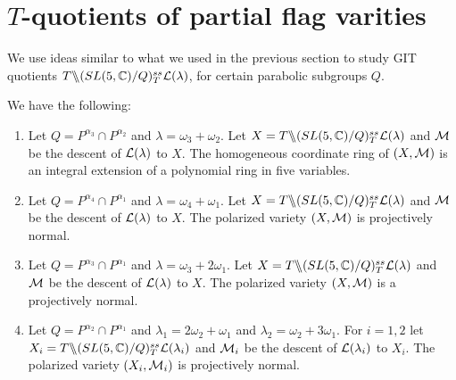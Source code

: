 \section{$T$-quotients of partial flag varities}
\label{sec:fv_normality}
We use ideas similar to what we used in the previous section to study GIT quotients $T\backslash\mkern-6mu\backslash(SL(5, \mathbb{C})/Q)^{ss}_{T} {\mathcal L}(\lambda)$, for certain parabolic subgroups $Q$. 

\begin{theorem}
\label{thm:flag}
    We have the following:
\begin{enumerate}
    \item Let $Q = P^{\alpha_3} \cap P^{\alpha_2}$ and $\lambda = \omega_3 + \omega_2$. Let $X = T \backslash\mkern-6mu\backslash (SL(5,\mathbb{C})/Q)^{ss}_T {\cal L}(\lambda)$ and \(\cal M\) be the descent of \(\cal L(\lambda)\) to \(X\).  The homogeneous coordinate ring of $(X,{\cal M})$ is an integral extension of a polynomial ring in five variables.
    \item Let $Q = P^{\alpha_4} \cap P^{\alpha_1}$ and $\lambda = \omega_4 + \omega_1$. Let $X = T \backslash\mkern-6mu\backslash (SL(5,\mathbb{C})/Q)^{ss}_T {\cal L}(\lambda)$ and \(\cal M\) be the descent of \({\cal L}(\lambda)\) to \(X\). The polarized variety $(X,{\cal M})$ is projectively normal.
    \item Let $Q = P^{\alpha_3} \cap P^{\alpha_1}$ and $\lambda = \omega_3 + 2\omega_1$. Let $X = T \backslash\mkern-6mu\backslash (SL(5,\mathbb{C})/Q)^{ss}_T {\cal L}(\lambda)$ and \(\cal M\) be the descent of \({\cal L}(\lambda)\) to \(X\). The polarized variety $(X,{\cal M})$ is a projectively normal.
    \item Let $Q= P^{\alpha_2} \cap P^{\alpha_1}$ and $\lambda_1 = 2\omega_2 + \omega_1$ and $\lambda_2 = \omega_2 + 3 \omega_1$. For $i=1,2$ let $X_i = T \backslash\mkern-6mu\backslash (SL(5,\mathbb{C})/Q)^{ss}_T {\cal L}(\lambda_i)$ and \({\cal M}_i\) be the descent of \({\cal L}(\lambda_i)\) to \(X_i\).  The polarized variety $(X_i,{\cal M}_i)$ is projectively normal.
\end{enumerate}
\end{theorem}

